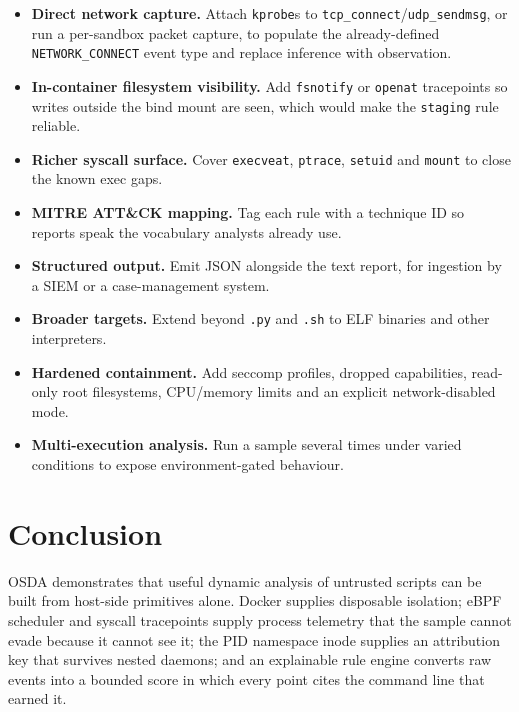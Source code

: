 \documentclass[11pt,a4paper]{article}
\newcommand{\code}[1]{\texttt{\small #1}}
\begin{document}
\begin{itemize}[leftmargin=*]
  \item \textbf{Direct network capture.} Attach \code{kprobe}s to
        \code{tcp\_connect}/\code{udp\_sendmsg}, or run a per-sandbox packet
        capture, to populate the already-defined \code{NETWORK\_CONNECT} event type
        and replace inference with observation.
  \item \textbf{In-container filesystem visibility.} Add \code{fsnotify} or
        \code{openat} tracepoints so writes outside the bind mount are seen, which
        would make the \code{staging} rule reliable.
  \item \textbf{Richer syscall surface.} Cover \code{execveat}, \code{ptrace},
        \code{setuid} and \code{mount} to close the known exec gaps.
  \item \textbf{MITRE ATT\&CK mapping.} Tag each rule with a technique ID so reports
        speak the vocabulary analysts already use.
  \item \textbf{Structured output.} Emit JSON alongside the text report, for
        ingestion by a SIEM or a case-management system.
  \item \textbf{Broader targets.} Extend beyond \code{.py} and \code{.sh} to ELF
        binaries and other interpreters.
  \item \textbf{Hardened containment.} Add seccomp profiles, dropped capabilities,
        read-only root filesystems, CPU/memory limits and an explicit
        network-disabled mode.
  \item \textbf{Multi-execution analysis.} Run a sample several times under varied
        conditions to expose environment-gated behaviour.
\end{itemize}

\section{Conclusion}

OSDA demonstrates that useful dynamic analysis of untrusted scripts can be built
from host-side primitives alone. Docker supplies disposable isolation; eBPF
scheduler and syscall tracepoints supply process telemetry that the sample cannot
evade because it cannot see it; the PID namespace inode supplies an attribution key
that survives nested daemons; and an explainable rule engine converts raw events
into a bounded score in which every point cites the command line that earned it.
\end{document}

